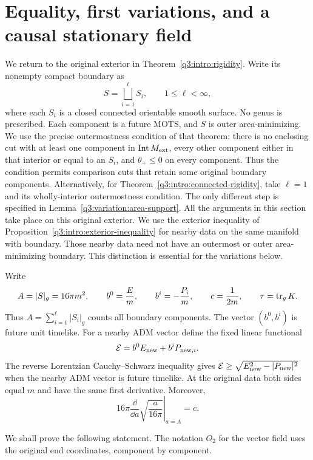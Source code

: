 \section{Equality, first variations, and a causal stationary field}
\label{q3:variation:section}

We return to the original exterior in Theorem~\ref{q3:intro:rigidity}.
Write its nonempty compact boundary as
\[
 S=\bigsqcup_{i=1}^{\ell}S_i,\qquad 1\leq\ell<\infty,
\]
where each $S_i$ is a closed connected orientable smooth surface.
No genus is prescribed.  Each component is a future MOTS, and $S$
is outer area-minimizing.  We use the precise outermostness condition
of that theorem: there is no enclosing cut with at least one component
in $\operatorname{Int}M_{\mathrm{ext}}$, every other component either in that
interior or equal to an $S_i$, and $\theta_+\leq0$ on every component.
Thus the condition permits comparison cuts that retain some original
boundary components. Alternatively, for
Theorem~\ref{q3:intro:connected-rigidity}, take $\ell=1$ and its
wholly-interior outermostness condition. The only different step is
specified in Lemma~\ref{q3:variation:area-support}.
All the arguments in this section
take place on this original exterior.  We use the exterior inequality
of Proposition~\ref{q3:intro:exterior-inequality} for nearby data on the same manifold with boundary.
Those nearby data need not have an outermost or outer area-minimizing
boundary.  This distinction is essential for the variations below.

Write
\[
 A=|S|_g=16\pi m^2,\qquad
 b^0=\frac Em,\qquad b^i=-\frac{P_i}{m},\qquad
 c=\frac1{2m},\qquad \tau=\operatorname{tr}_g K.
\]
Thus $A=\sum_{i=1}^{\ell}|S_i|_g$ counts all boundary components.
The vector $(b^0,b^i)$ is future unit timelike.  For a nearby ADM
vector define the fixed linear functional
\begin{equation}
 \mathcal E=b^0E_{\rm new}+b^iP_{{\rm new},i}.
 \label{q3:variation:supporting-energy}
\end{equation}
The reverse Lorentzian Cauchy--Schwarz inequality gives
$\mathcal E\ge\sqrt{E_{\rm new}^2-|P_{\rm new}|^2}$ when the
nearby ADM vector is future timelike.  At the original data both sides
equal $m$ and have the same first derivative.  Moreover,
\begin{equation}
 \left.16\pi\frac{\dd}{\dd a}\sqrt{\frac a{16\pi}}
 \right|_{a=A}=c.
 \label{q3:variation:area-coefficient}
\end{equation}

We shall prove the following statement.  The notation $O_2$ for the
vector field uses the original end coordinates, component by component.


